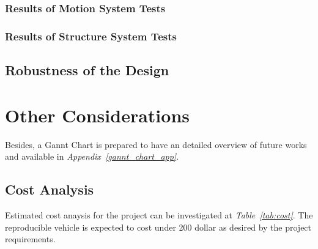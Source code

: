 \documentclass[a4paper,12pt]{article}
\begin{document}
	
	\subsubsection*{Results of Motion System Tests}
	
	
	
	\subsubsection*{Results of Structure System Tests}
	
	
	
	\subsection{Robustness of the Design}
	
	
	
	
	
	
	
	
	\section{Other Considerations}

Besides, a Gannt Chart is prepared to have an detailed overview of future works and available in \textit{Appendix~\ref{gannt_chart_app}}.
	
	
	
	
	\subsection{Cost Analysis}
		Estimated cost anaysis for the project can be investigated at \textit{Table~\ref{tab:cost}}. The reproducible vehicle is expected to cost under 200 dollar as desired by the project requirements.
	
\end{document}
